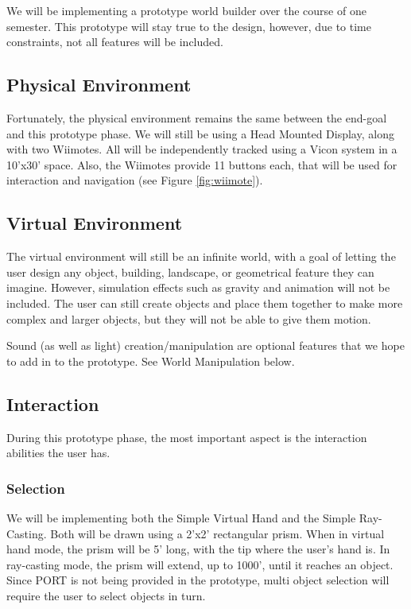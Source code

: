 We will be implementing a prototype world builder over the course of one semester.
This prototype will stay true to the design, however, due to time constraints, not all features will be included.

\subsection{Physical Environment}
Fortunately, the physical environment remains the same between the end-goal and this prototype phase.
We will still be using a Head Mounted Display, along with two Wiimotes.
All will be independently tracked using a Vicon system in a 10'x30' space.
Also, the Wiimotes provide 11 buttons each, that will be used for interaction and navigation (see Figure \ref{fig:wiimote}).

\subsection{Virtual Environment}
The virtual environment will still be an infinite world, with a goal of letting the user design any object, building, landscape, or geometrical feature they can imagine.
However, simulation effects such as gravity and animation will not be included.
The user can still create objects and place them together to make more complex and larger objects, but they will not be able to give them motion.

Sound (as well as light) creation/manipulation are optional features that we hope to add in to the prototype.  See World Manipulation below.

\subsection{Interaction}
During this prototype phase, the most important aspect is the interaction abilities the user has.

\subsubsection{Selection}
We will be implementing both the Simple Virtual Hand and the Simple Ray-Casting.
Both will be drawn using a 2'x2' rectangular prism.
When in virtual hand mode, the prism will be 5' long, with the tip where the user's hand is.
In ray-casting mode, the prism will extend, up to 1000', until it reaches an object.
Since PORT is not being provided in the prototype, multi object selection will require the user to select objects in turn.

